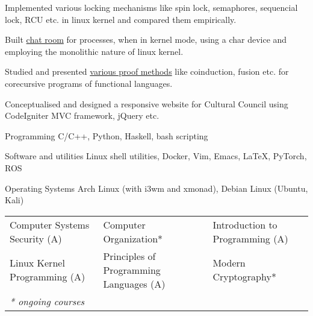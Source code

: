 \documentclass[11pt, a4paper]{cv}
\begin{document}
\begin{cventries}

    \begin{cvitems} %
        \item {Implemented various locking mechanisms like spin lock, semaphores, sequencial lock, RCU etc. in linux kernel and compared them empirically.}
        \item {Built \href{https://github.com/shivnshu/chatroom}{chat room} for processes, when in kernel mode, using a char device and employing the monolithic nature of linux kernel.}
        \item {Studied and presented \href{http://home.iitk.ac.in/~shivansh/resources/proofmethods-corecursion.pdf}{various proof methods} like coinduction, fusion etc. for corecursive programs of functional languages.}
        \item {Conceptualised and designed a responsive website for Cultural Council using CodeIgniter MVC framework, jQuery etc.}
    \end{cvitems}

\end{cventries}




\begin{cvskills}

  \cvskill
    {Programming} %
    {C/C++, Python, Haskell, bash scripting} %

  \cvskill
    {Software and utilities} %
    {Linux shell utilities, Docker, Vim, Emacs, \LaTeX, PyTorch, ROS} %

  \cvskill
    {Operating Systems} %
    {Arch Linux (with i3wm and xmonad), Debian Linux (Ubuntu, Kali)} %

\end{cvskills}

\begin{cventries}
        \begin{tabular}{l l l}
                Computer Systems Security (A)& Computer Organization* & Introduction to Programming (A)\\
                Linux Kernel Programming (A) & Principles of Programming Languages (A) & Modern Cryptography*\\
                \textit{\small {\color{lightgray}* ongoing courses}}
        \end{tabular}
\vspace{-0.3cm}
\end{cventries}


\begin{cventries}
        \begin{cvitems}
        \item {}
        \end{cvitems}
\end{cventries}

\end{document}
